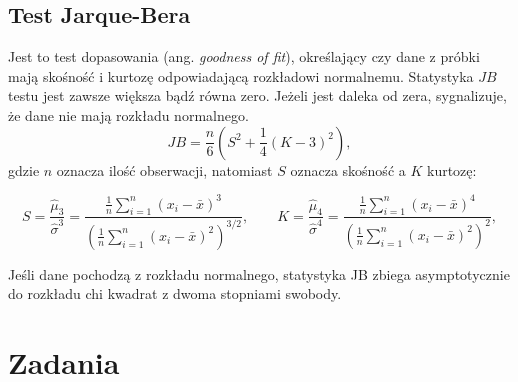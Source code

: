 \documentclass{article}
\theoremstyle{break}
\begin{document}
	\subsection*{Test Jarque-Bera}
	 Jest to test dopasowania (ang. \textit{goodness of fit}), określający czy dane z próbki mają skośność i kurtozę odpowiadającą rozkładowi normalnemu. Statystyka $JB$ testu jest zawsze większa bądź równa zero. Jeżeli jest daleka od zera, sygnalizuje, że dane nie mają rozkładu normalnego.
	 $$JB = \frac{n}{6} \left( S^2 + \frac{1}{4} (K-3)^2 \right),$$
	 gdzie $n$ oznacza ilość obserwacji, natomiast $S$ oznacza skośność a $K$ kurtozę:
	 
	 $$S={\frac  {{\hat  {\mu }}_{3}}{{\hat  {\sigma }}^{3}}}={\frac  {{\frac  1n}\sum _{{i=1}}^{n}(x_{i}-{\bar  {x}})^{3}}{\left({\frac  1n}\sum _{{i=1}}^{n}(x_{i}-{\bar  {x}})^{2}\right)^{{3/2}}}},\qquad K={\frac {{\hat {\mu }}_{4}}{{\hat {\sigma }}^{4}}}={\frac {{\frac {1}{n}}\sum _{i=1}^{n}(x_{i}-{\bar {x}})^{4}}{\left({\frac {1}{n}}\sum _{i=1}^{n}(x_{i}-{\bar {x}})^{2}\right)^{2}}},$$
	 
	 Jeśli dane pochodzą z rozkładu normalnego, statystyka JB zbiega asymptotycznie do rozkładu chi kwadrat z dwoma stopniami swobody.
\section{Zadania}
\end{document}
